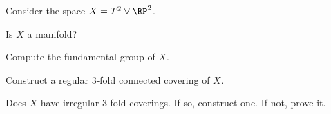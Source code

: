 Consider the space $X=T^2\vee \RP^2$.
\begin{alist}
\item Is $X$ a manifold?
\item Compute the fundamental group of $X$.
\item Construct a regular $3$-fold connected covering of $X$.
\item Does $X$ have irregular $3$-fold coverings. If so, construct
one. If not, prove it.
\end{alist}

